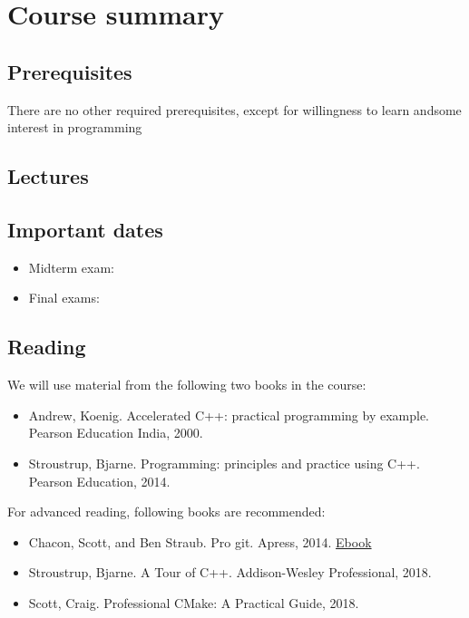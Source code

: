 \documentclass[11pt,letterpaper]{article}
\begin{document}
\section*{Course summary}


\subsection*{Prerequisites}
There   are   no other required   prerequisites,   except   for   willingness   to   learn   andsome   interest   in programming 

\subsection*{Lectures}


\subsection*{Important dates}

\begin{itemize}
\item Midterm exam:
\item Final exams:

\end{itemize}

\subsection*{Reading}

We will use material from the following two books in the course:

\begin{itemize}
\item Andrew, Koenig. Accelerated C++: practical programming by example. Pearson Education India, 2000.
\item Stroustrup, Bjarne. Programming: principles and practice using C++. Pearson Education, 2014.
\end{itemize}

For advanced reading, following books are recommended:

\begin{itemize}
\item Chacon, Scott, and Ben Straub. Pro git. Apress, 2014. \href{https://github.com/progit/progit2/releases/download/2.1.146/progit.pdf}{Ebook}
\item Stroustrup, Bjarne. A Tour of C++. Addison-Wesley Professional, 2018.
\item Scott, Craig. Professional CMake: A Practical Guide, 2018.
\end{itemize}
\end{document}
